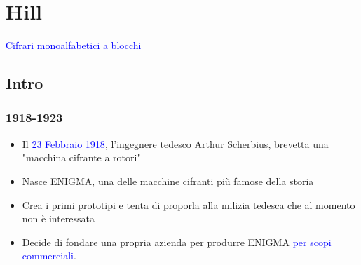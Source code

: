 \section{Hill}

	\begin{frame}
		\begin{center}
			\LARGE{\textcolor{blue}{Cifrari monoalfabetici a blocchi}}
		\end{center}
	\end{frame}

	\subsection{Intro}
	
		\begin{frame}
			\frametitle{1918-1923}		
			\begin{itemize}
				\item Il \textcolor{blue}{23 Febbraio 1918}, l'ingegnere tedesco \alert{Arthur Scherbius}, brevetta una "macchina cifrante a rotori"
				\item Nasce \alert{ENIGMA}, una delle macchine cifranti più famose della storia
				\item Crea i primi prototipi e tenta di proporla alla milizia tedesca che al momento non è interessata
				\item Decide di fondare una propria azienda per produrre ENIGMA \textcolor{blue}{per scopi commerciali}. 
			\end{itemize}
		\end{frame}


